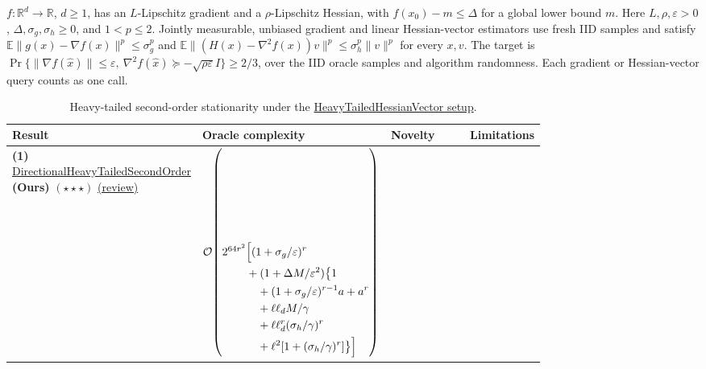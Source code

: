 \begin{table}[tp]
\centering
\caption{Heavy-tailed second-order stationarity under the \href{https://github.com/k3nfalt/longtails/blob/main/LongTails/Setups/HeavyTailedHessianVector.lean}{HeavyTailedHessianVector setup}.}\label{tab:HeavyTailedHessianVector}
\parbox{\linewidth}{\footnotesize $f:\mathbb R^d\to\mathbb R$, $d\geq1$, has an $L$-Lipschitz gradient and a $\rho$-Lipschitz Hessian, with $f(x_0)-m\leq\Delta$ for a global lower bound $m$. Here $L,\rho,\varepsilon>0$, $\Delta,\sigma_g,\sigma_h\geq0$, and $1<p\leq2$. Jointly measurable, unbiased gradient and linear Hessian-vector estimators use fresh IID samples and satisfy $\mathbb E\|g(x)-\nabla f(x)\|^p\leq\sigma_g^p$ and $\mathbb E\|(H(x)-\nabla^2f(x))v\|^p\leq\sigma_h^p\|v\|^p$ for every $x,v$. The target is $\Pr\{\|\nabla f(\widehat x)\|\leq\varepsilon,\ \nabla^2f(\widehat x)\succeq-\sqrt{\rho\varepsilon}I\}\geq2/3$, over the IID oracle samples and algorithm randomness. Each gradient or Hessian-vector query counts as one call.}\par\smallskip
\begin{threeparttable}
\footnotesize
\setlength{\tabcolsep}{4pt}\renewcommand{\arraystretch}{1.25}
\begin{tabularx}{\linewidth}{@{}>{\raggedright\arraybackslash}p{0.20\linewidth}>{\raggedright\arraybackslash}p{0.32\linewidth}>{\raggedright\arraybackslash}p{0.25\linewidth}>{\raggedright\arraybackslash}X@{}}
\toprule
\textbf{Result} & \textbf{Oracle complexity} & \textbf{Novelty} & \textbf{Limitations} \\
\midrule
\textbf{(1)} \href{https://github.com/k3nfalt/longtails/blob/main/LongTails/Theorems/DirectionalHeavyTailedSecondOrder.lean}{Directional\allowbreak Heavy\allowbreak Tailed\allowbreak Second\allowbreak Order} \textbf{(Ours)} $(\star\star\star)$ \href{https://github.com/k3nfalt/longtails/blob/main/scripts/reviews/DirectionalHeavyTailedSecondOrder.md}{(review)}
& $\mathcal O\!\left(2^{64r^2}\begin{aligned}[t]
&\Bigl[(1+\sigma_g/\varepsilon)^r\\
&+(1+\Delta M/\varepsilon^2)\bigl\{1\\
&\quad +(1+\sigma_g/\varepsilon)^{r-1}a+a^r\\
&\quad +\ell\ell_d M/\gamma\\
&\quad +\ell\ell_d^r(\sigma_h/\gamma)^r\\
&\quad +\ell^2[1+(\sigma_h/\gamma)^r]\bigr\}\Bigr]
\end{aligned}\right)$
& & \\

\end{tabularx}
\end{threeparttable}
\end{table}
